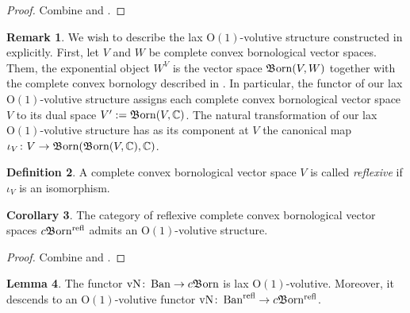 \documentclass{article}
\newcommand{\Ban}{\operatorname{Ban}}%
\newcommand{\Born}{\mathfrak{B}\hspace{-0.05cm}\operatorname{orn}}%
\newcommand{\cBorn}{c\mathfrak{B}\hspace{-0.05cm}\operatorname{orn}}%
\newcommand{\vN}{\operatorname{vN}}%
\newcommand{\refl}{\operatorname{refl}}%
\newcommand{\Oone}{\operatorname{O(1)}}
\numberwithin{equation}{section}
\theoremstyle{definition}
\newtheorem{definition}{Definition}[subsection]
\newtheorem{lemma}[definition]{Lemma}
\newtheorem{remark}[definition]{Remark}
\newtheorem{corollary}[definition]{Corollary}
\theoremstyle{theorem}
\begin{document}
\begin{proof}
    Combine  and .
\end{proof}
\begin{remark}
    We wish to describe the lax $\Oone$-volutive structure constructed in  explicitly. 
    First, let $V$ and $W$ be complete convex bornological vector spaces. Them, the exponential object $W^V$ is the vector space $\Born(V,W)$ 
    together with the complete convex bornology described in \cite[Section 2.6 \& Proposition 2.5.1]{aretz2025functorialitybornological}. In particular, 
    the functor of our lax $\Oone$-volutive structure assigns each complete convex bornological vector space $V$ to its dual space $V' := \Born(V,\mathbb{C})$.
    The natural transformation of our lax $\Oone$-volutive structure has as its component at $V$ the canonical map 
    $\iota_V \colon V \to \Born(\Born(V,\mathbb{C}),\mathbb{C})$.
\end{remark}
\begin{definition}
    A complete convex bornological vector space $V$ is called \emph{reflexive} if $\iota_V$ is an isomorphism. 
\end{definition}
\begin{corollary}
    The category of reflexive complete convex bornological vector spaces $\cBorn^{\refl}$ admits an $\Oone$-volutive structure.
\end{corollary}
\begin{proof}
    Combine  and .
\end{proof}
\begin{lemma}
    The functor $\vN \colon \Ban \to \cBorn$ is lax $\Oone$-volutive. Moreover, it descends to an $\Oone$-volutive functor 
    $\vN \colon \Ban^{\refl} \to \cBorn^{\refl}$. 
\end{lemma}
\end{document}
